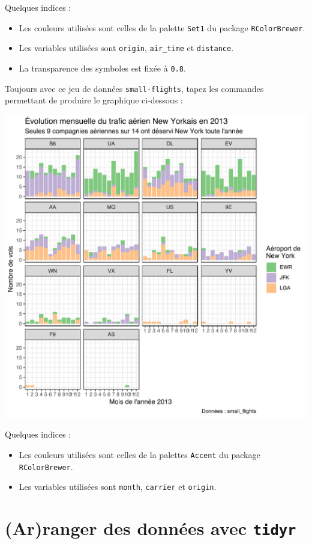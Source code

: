 \documentclass[a4paperpaper,]{article}
\providecommand{\tightlist}{%
  \setlength{\itemsep}{0pt}\setlength{\parskip}{0pt}}
\begin{document}
Quelques indices :

\begin{itemize}
\tightlist
\item
  Les couleurs utilisées sont celles de la palette \texttt{Set1} du package \texttt{RColorBrewer}.
\item
  Les variables utilisées sont \texttt{origin}, \texttt{air\_time} et \texttt{distance}.
\item
  La transparence des symboles est fixée à \texttt{0.8}.
\end{itemize}

Toujours avec ce jeu de données \texttt{small-flights}, tapez les commandes permettant de produire le graphique ci-dessous :

\begin{center}\includegraphics[width=0.9\linewidth]{figure/exercice2-1} \end{center}

Quelques indices :

\begin{itemize}
\tightlist
\item
  Les couleurs utilisées sont celles de la palettes \texttt{Accent} du package \texttt{RColorBrewer}.
\item
  Les variables utilisées sont \texttt{month}, \texttt{carrier} et \texttt{origin}.
\end{itemize}

\hypertarget{tidyr}{%
\section{\texorpdfstring{(Ar)ranger des données avec \texttt{tidyr}}{(Ar)ranger des données avec tidyr}}\label{tidyr}}
\end{document}
